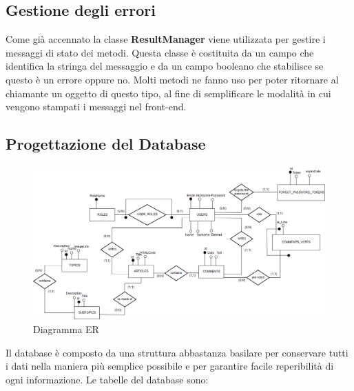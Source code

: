 \documentclass[12pt]{article}
\begin{document}
	\subsection{Gestione degli errori}
	Come già accennato la classe \textbf{ResultManager} viene utilizzata per gestire i messaggi di stato dei metodi.
	Questa classe è costituita da un campo che identifica la stringa del messaggio e da un campo booleano che stabilisce se questo è un errore oppure no.
	Molti metodi ne fanno uso per poter ritornare al chiamante un oggetto di questo tipo, al fine di semplificare le modalità in cui vengono stampati i messaggi nel front-end.
	
	\subsection{Progettazione del Database}
	\begin{figure} [H]
		\centering
		\includegraphics[scale=0.34]{img/ER_DevSpace.png}
		\caption{Diagramma ER}\label{}
	\end{figure}
	 Il database è composto da una struttura abbastanza basilare per conservare tutti i dati nella maniera più semplice possibile e per garantire facile reperibilità di ogni informazione. Le tabelle del database sono:
\end{document}

